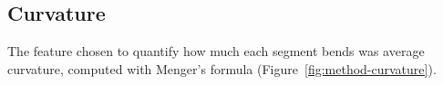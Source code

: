 \subsection{Curvature}
\label{sec:method-curvature}


The feature chosen to quantify how much each segment bends was average curvature, computed with Menger's formula (Figure~\ref{fig:method-curvature}).

